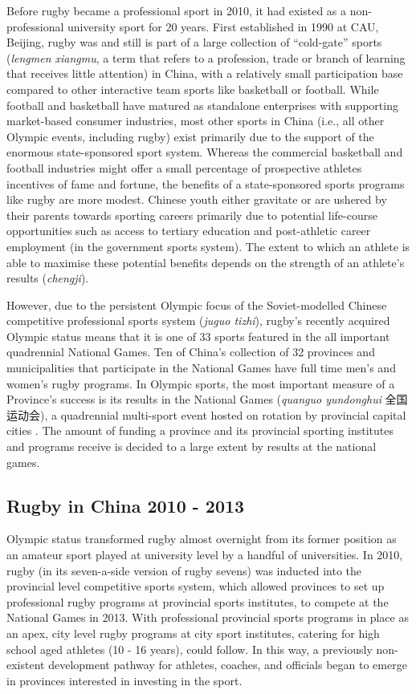 \begin{CJK}{UTF8}{gbsn}
Before rugby became a professional sport in 2010, it had existed as a non-professional university sport for 20 years.  First established in 1990 at CAU, Beijing, rugby was and still is part of a large collection of ``cold-gate'' sports (\textit{lengmen xiangmu}, a term that refers to a profession, trade or branch of learning that receives little attention) in China, with a relatively small participation base compared to other interactive team sports like basketball or football.  While football and basketball have matured as standalone enterprises with supporting market-based consumer industries, most other sports in China (i.e., all other Olympic events, including rugby) exist primarily due to the support of the enormous state-sponsored sport system.  Whereas the commercial basketball and football industries might offer a small percentage of prospective athletes incentives of fame and fortune, the benefits of a state-sponsored sports programs like rugby are more modest.  Chinese youth either gravitate or are ushered by their parents towards sporting careers primarily due to potential life-course opportunities such as access to tertiary education and post-athletic career employment (in the government sports system).  The extent to which an athlete is able to maximise these potential benefits depends on the strength of an athlete's results (\textit{chengji}).

However, due to the persistent Olympic focus of the Soviet-modelled Chinese competitive professional sports system (\textit{juguo tizhi}), rugby's recently acquired Olympic status means that it is one of 33 sports featured in the all important quadrennial National Games.  Ten of China's collection of 32 provinces and municipalities that participate in the National Games have full time men's and women's rugby programs.  In Olympic sports, the most important measure of a Province's success is its results in the National Games (\textit{quanguo yundonghui} 全国运动会), a quadrennial multi-sport event hosted on rotation by provincial capital cities \citep{Hong2002}.  The amount of funding a province and its provincial sporting institutes and programs receive is decided to a large extent by results at the national games.


\subsection{Rugby in China 2010 - 2013 \label{sect:rugbyinChina}}
Olympic status transformed rugby almost overnight from its former position as an amateur sport played at university level by a handful of universities.  In 2010, rugby (in its seven-a-side version of rugby sevens) was inducted into the provincial level competitive sports system, which allowed provinces to set up professional rugby programs at provincial sports institutes, to compete at the National Games in 2013.  With professional provincial sports programs in place as an apex, city level rugby programs at city sport institutes, catering for high school aged athletes (10 - 16 years), could follow.  In this way, a previously non-existent development pathway for athletes, coaches, and officials began to emerge in provinces interested in investing in the sport.


\end{CJK}
